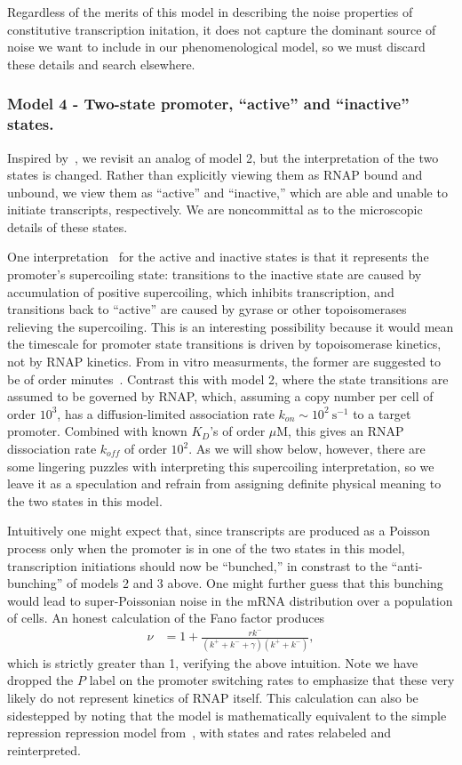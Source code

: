 Regardless of the merits of this model in describing the noise properties of
constitutive transcription initation, it does not capture the dominant source of
noise we want to include in our phenomenological model, so we must discard these
details and search elsewhere.

\subsubsection{Model 4 - Two-state promoter, ``active'' and ``inactive''
states.} Inspired by~\cite{Razo-Mejia2020}, we revisit an analog of model 2, but
the interpretation of the two states is changed. Rather than explicitly viewing
them as RNAP bound and unbound, we view them as ``active'' and ``inactive,''
which are able and unable to initiate transcripts, respectively. We are
noncommittal as to the microscopic details of these states.

One interpretation~\cite{Chong2014, Sevier2016} for the active and inactive
states is that it represents the promoter's supercoiling state: transitions to
the inactive state are caused by accumulation of positive supercoiling, which
inhibits transcription, and transitions back to ``active'' are caused by gyrase
or other topoisomerases relieving the supercoiling. This is an interesting
possibility because it would mean the timescale for promoter state transitions
is driven by topoisomerase kinetics, not by RNAP kinetics. From in vitro
measurments, the former are suggested to be of order minutes~\cite{Chong2014}.
Contrast this with model 2, where the state transitions are assumed to be
governed by RNAP, which, assuming a copy number per cell of order $10^3$, has a
diffusion-limited association rate $k_{on} \sim 10^2~\text{s}^{-1}$ to a target
promoter. Combined with known $K_D$'s of order $\mu$M, this gives an RNAP
dissociation rate $k_{off}$ of order $10^2$. As we will show below, however,
there are some lingering puzzles with interpreting this supercoiling
interpretation, so we leave it as a speculation and refrain from assigning
definite physical meaning to the two states in this model.

Intuitively one might expect that, since transcripts are produced as a Poisson
process only when the promoter is in one of the two states in this model,
transcription initiations should now be ``bunched,'' in constrast to the
``anti-bunching'' of models 2 and 3 above. One might further guess that this
bunching would lead to super-Poissonian noise in the mRNA distribution over a
population of cells. An honest calculation of the Fano factor produces
\begin{align}
\nu &= 1 + \frac{r k^-}{(k^+ + k^- + \gamma)(k^+ + k^-)},
\end{align}
which is strictly greater than 1, verifying the above intuition. Note we have
dropped the $P$ label on the promoter switching rates to emphasize that these
very likely do not represent kinetics of RNAP itself. This calculation can also
be sidestepped by noting that the model is mathematically equivalent to the
simple repression repression model from~\cite{Jones2014}, with states and rates
relabeled and reinterpreted.


